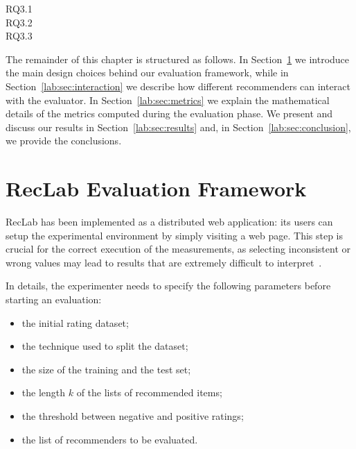 
\begin{description}
\item[RQ3.1\label{lab:itm:rq1}] 
\item[RQ3.2\label{lab:itm:rq2}] 
\item[RQ3.3\label{lab:itm:rq3}] 
\end{description}

The remainder of this chapter is structured as follows. In Section~\ref{lab:sec:framework} we introduce the main design choices behind our evaluation framework, while in Section~\ref{lab:sec:interaction} we describe how different recommenders can interact with the evaluator. In Section~\ref{lab:sec:metrics} we explain the mathematical details of the metrics computed during the evaluation phase. We present and discuss our results in Section~\ref{lab:sec:results} and, in Section~\ref{lab:sec:conclusion}, we provide the conclusions.

\section{RecLab Evaluation Framework}
\label{lab:sec:framework}

RecLab has been implemented as a distributed web application: its users can setup the experimental environment by simply visiting a web page. This step is crucial for the correct execution of the measurements, as selecting inconsistent or wrong values may lead to results that are extremely difficult to interpret~\cite{Jannach2015}.

In details, the experimenter needs to specify the following parameters before starting an evaluation:

\begin{itemize}
\item the initial rating dataset;
\item the technique used to split the dataset;
\item the size of the training and the test set;
\item the length $k$ of the lists of recommended items;
\item the threshold between negative and positive ratings;
\item the list of recommenders to be evaluated.
\end{itemize}

